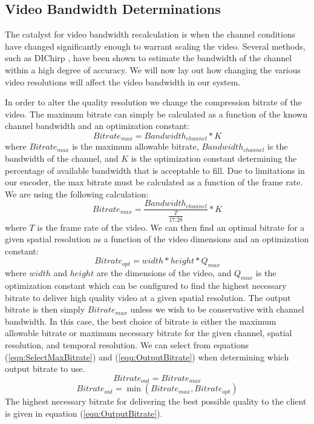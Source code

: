 \documentclass[preprint, 12pt]{elsarticle}
\begin{document}
\subsection{Video Bandwidth Determinations}
The catalyst for video bandwidth recalculation is when the channel conditions have changed significantly enough to warrant scaling the video. Several methods, such as DIChirp \cite{DIChirp}, have been shown to estimate the bandwidth of the channel within a high degree of accuracy. We will now lay out how changing the various video resolutions will affect the video bandwidth in our system.

In order to alter the quality resolution we change the compression bitrate of the video. The maximum bitrate can simply be calculated as a function of the known channel bandwidth and an optimization constant:
\begin{equation}
\label{equ:BitrateCalculation}
Bitrate_{max} = Bandwidth_{channel} * K
\end{equation}
where $Bitrate_{max}$  is the maximum allowable bitrate, $Bandwidth_{channel}$ is the bandwidth of the channel, and $K$ is the optimization constant determining the percentage of available bandwidth that is acceptable to fill. Due to limitations in our encoder, the max bitrate must be calculated as a function of the frame rate. We are using the following calculation: 
\begin{equation}
\label{equ:LimitedBitrateCalculation}
Bitrate_{max} = \frac {Bandwidth_{channel}}{\frac {T} {17.28} } * K
\end{equation}
where $T$ is the frame rate of the video. We can then find an optimal bitrate for a given spatial resolution as a function of the video dimensions and an optimization constant:
\begin{equation}
\label{equ:OptimalBitrate}
Bitrate_{opt} = width * height * Q_{max}
\end{equation}
where $width$ and $height$ are the dimensions of the video, and $Q_{max}$ is the optimization constant which can be configured to find the highest necessary bitrate to deliver high quality video at a given spatial resolution. The output bitrate is then simply $Bitrate_{max}$ unless we wish to be conservative with channel bandwidth. In this case, the best choice of bitrate is either the maximum allowable bitrate or maximum necessary bitrate for the given channel, spatial resolution, and temporal resolution. We can select from equations (\ref{equ:SelectMaxBitrate}) and (\ref{equ:OutputBitrate}) when determining which output bitrate to use.
\begin{equation}
\label{equ:SelectMaxBitrate}
Bitrate_{out} = Bitrate_{max}
\end{equation}
\begin{equation}
\label{equ:OutputBitrate}
Bitrate_{out} = \min (Bitrate_{max} , Bitrate_{opt})
\end{equation}
The highest necessary bitrate for delivering the best possible quality to the client is given in equation (\ref{equ:OutputBitrate}).
\end{document}
